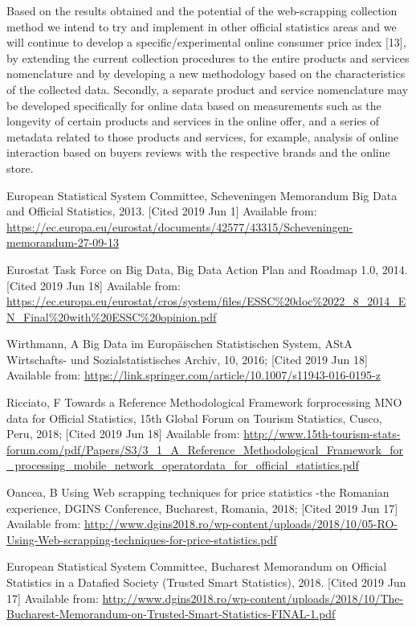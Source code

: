 \documentclass[]{article}
\begin{document}
Based on the results obtained and the potential of the web-scrapping collection method we intend to try and implement 
in other official statistics areas and we will continue to develop a specific/experimental online consumer price index [13], 
by extending the current collection procedures to the entire products and services nomenclature and by 
developing a new methodology based on the characteristics of the collected data. Secondly, a separate product and service nomenclature may 
be developed specifically for online data based on measurements such as the longevity of certain products 
and services in the online offer, and a series of metadata related to those products and services, for example, analysis of 
online interaction based on buyers reviews with the respective brands and the online store.


\begin{thebibliography}{99}
	

European Statistical System Committee, Scheveningen Memorandum Big Data and Official Statistics, 2013. [Cited 2019 Jun 1]
Available from: \url{https://ec.europa.eu/eurostat/documents/42577/43315/Scheveningen-memorandum-27-09-13}

Eurostat Task Force on Big Data, Big Data Action Plan and Roadmap 1.0, 2014. [Cited 2019 Jun 18]
Available from:
\url{https://ec.europa.eu/eurostat/cros/system/files/ESSC%20doc%2022_8_2014_EN_Final%20with%20ESSC%20opinion.pdf} 
	
Wirthmann, A Big Data im Europäischen Statistischen System, AStA Wirtschafts- und Sozialstatistisches Archiv, 10, 2016; [Cited 2019 Jun 18]
Available from:
\url{https://link.springer.com/article/10.1007/s11943-016-0195-z}

Ricciato, F Towards a Reference Methodological Framework forprocessing MNO data for Official Statistics, 15th Global Forum on Tourism Statistics, Cusco, Peru, 2018; [Cited 2019 Jun 18]
Available from:
\url{http://www.15th-tourism-stats-forum.com/pdf/Papers/S3/3_1_A_Reference_Methodological_Framework_for_processing_mobile_network_operatordata_for_official_statistics.pdf}

Oancea, B Using Web scrapping techniques for price statistics -the Romanian experience, DGINS Conference, Bucharest, Romania, 2018; [Cited 2019 Jun 17]
Available from:
\url{http://www.dgins2018.ro/wp-content/uploads/2018/10/05-RO-Using-Web-scrapping-techniques-for-price-statistics.pdf} 

European Statistical System Committee,  Bucharest Memorandum on Official Statistics in a Datafied Society (Trusted Smart Statistics), 2018. [Cited 2019 Jun 17]
Available from: \url{http://www.dgins2018.ro/wp-content/uploads/2018/10/The-Bucharest-Memorandum-on-Trusted-Smart-Statistics-FINAL-1.pdf}


\end{thebibliography}
\end{document}
